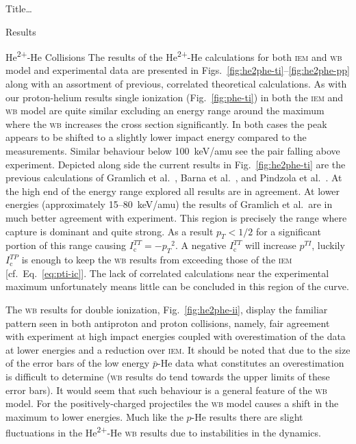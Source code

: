 \documentclass[letterpaper, 11 pt]{report}
\begin{document}
\begin{chapter}{ Title\dots \label{chap:p-he2p-he}}
\begin{section}{Results \label{sec:phe2p-res}}
\begin{subsection}{\texorpdfstring{He\textsuperscript{2+}}{He2+}-He Collisions 
                         \label{sec:he2phe-res}}
         The results of the He\textsuperscript{2+}-He calculations for both \textsc{iem} and \textsc{wb}
         model and experimental data are presented in Figs.~\ref{fig:he2phe-ti}--\ref{fig:he2phe-pp}
         along with an assortment of previous, correlated theoretical calculations. As with our
         proton-helium results single ionization (Fig.~\ref{fig:phe-ti}) in both the \textsc{iem} and
         \textsc{wb} model are quite similar excluding an energy range around the maximum where the
         \textsc{wb} increases the cross section significantly. In both cases the peak appears to be
         shifted to a slightly lower impact energy compared to the measurements. Similar behaviour below
         100~keV/amu see the pair falling above experiment. Depicted along side the current results in
         Fig.~\ref{fig:he2phe-ti} are the previous calculations of Gramlich et al.~\cite{GGS-89}, Barna
         et al.~\cite{BTB-05}, and Pindzola et al.~\cite{PRC-07}. At the high end of the energy range
         explored all results are in agreement. At lower energies (approximately 15--80~keV/amu) the
         results of Gramlich et al.\ are in much better agreement with experiment. This region is
         precisely the range where capture is dominant and quite strong. As a result $p_T < 1/2$ for a
         significant portion of this range causing $I^{TT}_\mathrm{c} = -{p_T}^2$. A negative
         $I^{TT}_\mathrm{c}$ will increase $p^{TI}$, luckily $I^{TP}_\mathrm{c}$ is enough to keep the
         \textsc{wb} results from exceeding those of the \textsc{iem}  [cf.\ Eq.~\eqref{eq:pti-ic}]. The
         lack of correlated calculations near the experimental maximum unfortunately means little can be
         concluded in this region of the curve.

         The \textsc{wb} results for double ionization, Fig.~\ref{fig:he2phe-ii}, display the familiar
         pattern seen in both antiproton and proton collisions, namely, fair agreement with experiment
         at high impact energies coupled with overestimation of the data at lower energies and a
         reduction over \textsc{iem}. It should be noted that due to the size of the error bars of the
         low energy $\bar{p}$-He data what constitutes an overestimation is difficult to determine
         (\textsc{wb} results do tend towards the upper limits of these error bars). It would seem that
         such behaviour is a general feature of the \textsc{wb} model. For the positively-charged
         projectiles the \textsc{wb} model causes a shift in the maximum to lower energies. Much like
         the $p$-He results there are slight fluctuations in the He\textsuperscript{2+}-He \textsc{wb}
         results due to instabilities in the dynamics.


\end{subsection}
\end{section}
\end{chapter}
\end{document}
